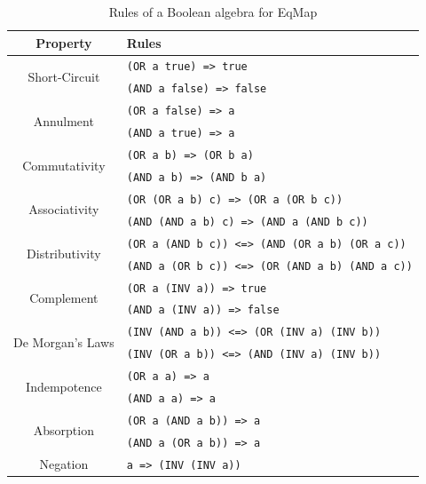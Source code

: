 \documentclass[10pt,letterpaper]{article}
\begin{document}
\begin{table}[h]
    \centering
    \begin{tabular}{cl}
        \toprule
        \textbf{Property}                 & \textbf{Rules}                                         \\ \midrule
        \multirow{2}{*}{Short-Circuit}    & \texttt{(OR a true) => true}                           \\
                                          & \texttt{(AND a false) => false}                        \\ \midrule
        \multirow{2}{*}{Annulment}        & \texttt{(OR a false) => a}                             \\
                                          & \texttt{(AND a true) => a}                             \\ \midrule
        \multirow{2}{*}{Commutativity}    & \texttt{(OR a b) => (OR b a)}                          \\
                                          & \texttt{(AND a b) => (AND b a)}                        \\ \midrule
        \multirow{2}{*}{Associativity}    & \texttt{(OR (OR a b) c) => (OR a (OR b c))}            \\
                                          & \texttt{(AND (AND a b) c) => (AND a (AND b c))}        \\ \midrule
        \multirow{2}{*}{Distributivity}   & \texttt{(OR a (AND b c)) <=> (AND (OR a b) (OR a c))}  \\
                                          & \texttt{(AND a (OR b c)) <=> (OR (AND a b) (AND a c))} \\ \midrule
        \multirow{2}{*}{Complement}       & \texttt{(OR a (INV a)) => true}                        \\
                                          & \texttt{(AND a (INV a)) => false}                      \\ \midrule
        \multirow{2}{*}{De Morgan's Laws} & \texttt{(INV (AND a b)) <=> (OR (INV a) (INV b))}      \\
                                          & \texttt{(INV (OR a b)) <=> (AND (INV a) (INV b))}      \\ \midrule
        \multirow{2}{*}{Indempotence}     & \texttt{(OR a a) => a}                                 \\
                                          & \texttt{(AND a a) => a}                                \\ \midrule
        \multirow{2}{*}{Absorption}       & \texttt{(OR a (AND a b)) => a}                         \\
                                          & \texttt{(AND a (OR a b)) => a}                         \\ \midrule
        Negation                          & \texttt{a => (INV (INV a))}                            \\
        \bottomrule
    \end{tabular}
    \caption{Rules of a Boolean algebra for EqMap}\label{tab:rules}
\end{table}
\end{document}
